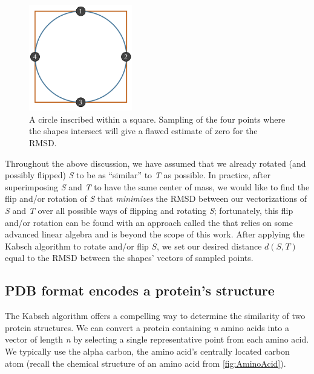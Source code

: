 \begin{figure}[h]
	\centering
	\mySfFamily
	\includegraphics[width = 0.4\textwidth]{../images/circle_square_undersampling.png}
	\caption{A circle inscribed within a square. Sampling of the four points where the shapes intersect will give a flawed estimate of zero for the RMSD.}
	\label{fig:circle_square_undersampling}
\end{figure}

Throughout the above discussion, we have assumed that we already rotated (and possibly flipped) \textit{S} to be as ``similar'' to \textit{T} as possible. In practice, after superimposing \textit{S} and \textit{T} to have the same center of mass, we would like to find the flip and/or rotation of \textit{S} that \textit{minimizes} the RMSD between our vectorizations of \textit{S} and \textit{T} over all possible ways of flipping and rotating \textit{S}; fortunately, this flip and/or rotation can be found with an approach called the  that relies on some advanced linear algebra and is beyond the scope of this work. After applying the Kabsch algorithm to rotate and/or flip $S$, we set our desired distance $d(S, T)$ equal to the RMSD between the shapes' vectors of sampled points.

\subsection{PDB format encodes a protein's structure}

The Kabsch algorithm offers a compelling way to determine the similarity of two protein structures. We can convert a protein containing \textit{n} amino acids into a vector of length \textit{n} by selecting a single representative point from each amino acid. We typically use the alpha carbon, the amino acid's centrally located carbon atom (recall the chemical structure of an amino acid from \autoref{fig:AminoAcid}).\\

